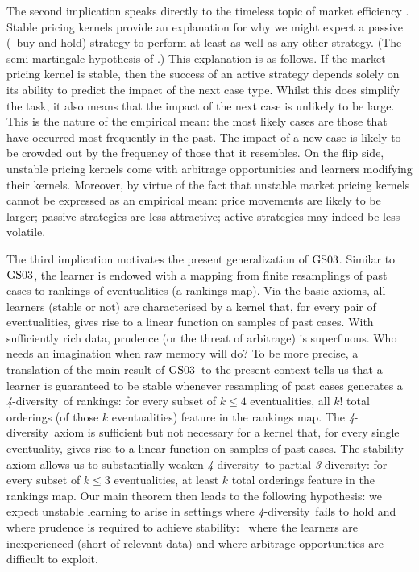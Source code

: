 \documentclass[12pt,a4paper,twoside]{article}
\newcommand{\gsii}{$\textup{GS03}$}
\newcommand{\parthreediv}{\textup{partial-\textit{3}-diversity}}
\newcommand{\fourdiv}{\textit{4}-\textup{diversity}}
\begin{document}
 
The second implication speaks directly to the timeless topic of market
efficiency
\citep{Bachelier-market-efficiency,Samuelson-market-efficiency,Fama-market-efficiency,Malkiel-market-efficiency,GKX-empirical-asset-pricing-via-ml}.
Stable pricing kernels provide an explanation for why we might expect a passive
(\ie\ buy-and-hold) strategy to perform at least as well as any other strategy.
(The semi-martingale hypothesis of \citet{Fama-market-efficiency}.) This
explanation is as follows. If the market pricing kernel is stable, then the
success of an active strategy depends solely on its ability to predict the
impact of the next case type.  Whilst this does simplify the task, it also
means that the impact of the next case is unlikely to be large. This is the
nature of the empirical mean: the most likely cases are those that have
occurred most frequently in the past. The impact of a new case is likely to be
crowded out by the frequency of those that it resembles.  On the flip side,
unstable pricing kernels come with arbitrage opportunities and learners
modifying their kernels.  Moreover, by virtue of the fact that unstable market
pricing kernels cannot be expressed as an empirical mean: price movements are
likely to be larger; passive strategies are less attractive; active strategies
may indeed be less volatile.

The third implication motivates the present {generalization} of \gsii. Similar to
\gsii, the learner is endowed with a mapping from finite resamplings of past
cases to rankings of eventualities (a rankings map).  Via the basic axioms, all
learners (stable or not) are characterised by a kernel that, for every pair of
eventualities, gives rise to a linear function on samples of past cases.
With sufficiently rich data, prudence (or the threat of arbitrage) is
superfluous. Who needs an imagination when raw memory will do? To be more
precise, a translation of the main result of \gsii\ to the present context
tells us that a learner is guaranteed to be stable whenever resampling of past
cases generates a \fourdiv\ of rankings: for every subset of $k \leq 4$
eventualities, all $k!$ total orderings (of those $k$ eventualities) feature in
the rankings map.  The \fourdiv\ axiom is sufficient but not necessary for
a kernel that, for every single eventuality, gives rise to a linear function on
samples of past cases. The stability axiom allows us to substantially weaken
\fourdiv\ to \parthreediv: for every subset of $k \leq 3$ eventualities, at
least $k$ total orderings feature in the rankings map. Our main theorem then
leads to the following hypothesis: we expect unstable learning to arise in
settings where \fourdiv\ fails to hold and where prudence is required to
achieve stability: \ie\ where the learners are inexperienced (short of
relevant data) and where arbitrage opportunities are difficult to exploit.
\end{document}
